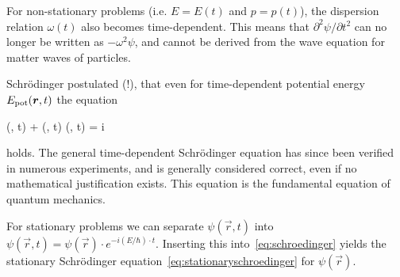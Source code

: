 \documentclass[../../script.tex]{subfiles}
\begin{document}
For non-stationary problems (i.e. $E = E(t)$ and $p = p(t)$), the dispersion relation $\omega(t)$ also becomes time-dependent. This means that $\partial^2\psi/\partial t^2$ can no longer be written as $-\omega^2 \psi$, and cannot be derived from the wave equation for matter waves of particles.

Schrödinger postulated (!), that even for time-dependent potential energy $E_{\text{pot}}(\vb*{r}, t)$ the equation 
\begin{tcolorbox}\label{eq:schroedinger}
	 \laplacian \psi(, t) + \epot(, t) \psi(, t) = i\hbar{}
\end{tcolorbox}
holds. The general time-dependent Schrödinger equation has since been verified in numerous experiments, and is generally considered correct, even if no mathematical justification exists.
This equation is the fundamental equation of quantum mechanics.

For stationary problems we can separate $\psi(\vec{r}, t)$ into $\psi(\vec{r}, t) = \psi(\vec{r}) \cdot e^{-i(E/\hbar) \cdot t}$. Inserting this into~\eqref{eq:schroedinger} yields the 
stationary Schrödinger equation~\eqref{eq:stationaryschroedinger} for $\psi(\vec{r})$.
\end{document}
